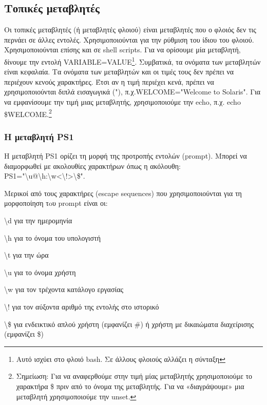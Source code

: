 \subsection{Τοπικές μεταβλητές}

Οι τοπικές μεταβλητές (ή μεταβλητές φλοιού) είναι μεταβλητές που ο φλοιός δεν τις περνάει σε άλλες εντολές. Χρησιμοποιούνται για την ρύθμιση
του ίδιου του φλοιού.
Χρησιμοποιούνται επίσης και σε shell scripts. Για να ορίσουμε μία μεταβλητή, δίνουμε την εντολή VARIABLE=VALUE\footnote{Αυτό ισχύει στο φλοιό bash. Σε άλλους φλοιούς αλλάζει η σύνταξη}. Συμβατικά, τα ονόματα των
μεταβλητών είναι κεφαλαία. Τα ονόματα των μεταβλητών και οι τιμές τους δεν πρέπει να περιέχουν κενούς χαρακτήρες. Έτσι αν η τιμή περιέχει
κενά, πρέπει να χρησιμοποιούνται διπλά εισαγωγικά ("), π.χ.WELCOME="Welcome to Solaris". Για να εμφανίσουμε την τιμή μιας μεταβλητής,
χρησιμοποιούμε την echo, π.χ. echo \$WELCOME.\footnote{Σημείωση: Για να αναφερθούμε στην τιμή μίας μεταβλητής χρησιμοποιούμε το χαρακτήρα \$
	πριν από το όνομα της μεταβλητής. Για να «διαγράψουμε» μια μεταβλητή χρησιμοποιούμε την unset. } 

\subsubsection{Η μεταβλητή PS1}

Η μεταβλητή PS1 ορίζει τη μορφή της προτροπής εντολών (prompt). Μπορεί να
διαμορφωθεί με ακολουθίες χαρακτήρων όπως η ακόλουθη:
PS1="{\textbackslash}u@{\textbackslash}h:{\textbackslash}w<{\textbackslash}!>{\textbackslash}\$".

Μερικοί από τους χαρακτήρες (escape sequences) που χρησιμοποιούνται για τη
μορφοποίηση τoυ prompt είναι οι:

\begin{packed_item}
	\item {\textbackslash}d για την ημερομηνία
	\item {\textbackslash}h για το όνομα του υπολογιστή
	\item {\textbackslash}t για την ώρα
	\item {\textbackslash}u για το όνομα χρήστη
	\item {\textbackslash}w για τον τρέχοντα κατάλογο εργασίας
	\item {\textbackslash}! για τον αύξοντα αριθμό της εντολής στο ιστορικό
	\item {\textbackslash}\$ για ενδεικτικό απλού χρήστη (εμφανίζει \#) ή χρήστη με δικαιώματα διαχείρισης (εμφανίζει \$)
\end{packed_item}

